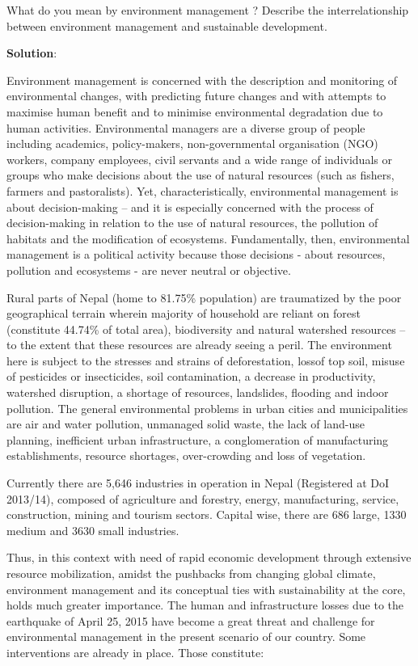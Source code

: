 \documentclass[
  openany]{book}
\newcommand{\question}{\item}
\newenvironment{solution}{ {\bfseries Solution}:}{}
\begin{document}
\begin{questions}
\question What do you mean by environment management ? Describe the interrelationship between environment management and sustainable development.

\begin{solution}

Environment management is concerned with the description and monitoring of environmental changes, with predicting future changes and with attempts to maximise human benefit and to minimise environmental degradation due to human activities. Environmental managers are a diverse group of people including academics, policy-makers, non-governmental organisation (NGO) workers, company employees, civil servants and a wide range of individuals or groups who make decisions about the use of natural resources (such as fishers, farmers and pastoralists). Yet, characteristically, environmental management is about decision-making -- and it is especially concerned with the process of decision-making in relation to the use of natural resources, the pollution of habitats and the modification of ecosystems. Fundamentally, then, environmental management is a political activity because those decisions - about resources, pollution and ecosystems - are never neutral or objective.

Rural parts of Nepal (home to 81.75\% population) are traumatized by the poor geographical terrain wherein majority of household are reliant on forest (constitute 44.74\% of total area), biodiversity and natural watershed resources -- to the extent that these resources are already seeing a peril. The environment here is subject to the stresses and strains of deforestation, lossof top soil, misuse of pesticides or insecticides, soil contamination, a decrease in productivity, watershed disruption, a shortage of resources, landslides, flooding and indoor pollution. The general environmental problems in urban cities and municipalities are air and water pollution, unmanaged solid waste, the lack of land-use planning, inefficient urban infrastructure, a conglomeration of manufacturing establishments, resource shortages, over-crowding and loss of vegetation.

Currently there are 5,646 industries in operation in Nepal (Registered at DoI 2013/14), composed of agriculture and forestry, energy, manufacturing, service, construction, mining and tourism sectors. Capital wise, there are 686 large, 1330 medium and 3630 small industries.

Thus, in this context with need of rapid economic development through extensive resource mobilization, amidst the pushbacks from changing global climate, environment management and its conceptual ties with sustainability at the core, holds much greater importance. The human and infrastructure losses due to the earthquake of April 25, 2015 have become a great threat and challenge for environmental management in the present scenario of our country. Some interventions are already in place. Those constitute:


\end{solution}
\end{questions}
\end{document}
